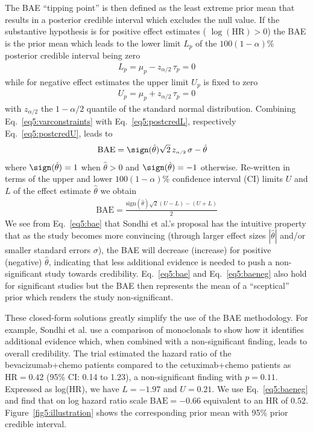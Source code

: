 The BAE ``tipping point'' is then defined as the least extreme prior mean that
results in a posterior credible interval which excludes the null value. If the
substantive hypothesis is for positive effect estimates (\eg
$\log(\mbox{HR}) > 0$) the BAE is the prior mean which leads to the lower limit
$L_{p}$ of the $100(1 - \alpha)$\% posterior credible interval being zero
\begin{align}
  L_{p} = \mu_{p} - z_{\scriptscriptstyle \alpha/2} \, \tau_{p} = 0
  \label{eq5:postcredL}
\end{align}
while for negative effect estimates the upper limit $U_{p}$ is fixed to zero
\begin{align}
  U_{p} = \mu_{p} + z_{\scriptscriptstyle \alpha/2} \, \tau_{p} = 0
  \label{eq5:postcredU}
\end{align}
with $z_{\scriptscriptstyle \alpha/2}$ the $1 - \alpha/2$ quantile of the
standard normal distribution. Combining Eq.~\eqref{eq5:varconstraints} with
Eq.~\eqref{eq5:postcredL}, respectively Eq.~\eqref{eq5:postcredU}, leads to
\begin{align}
  \text{BAE}
  & =  \sign(\hat{\theta}) \sqrt{2} \, z_{\scriptscriptstyle \alpha/2} \, \sigma - \hat{\theta}
    \label{eq5:bae}
\end{align}
where $\sign(\hat{\theta}) = 1$ when $\hat{\theta} > 0$ and
$\sign(\hat{\theta}) = -1$ otherwise. Re-written in terms of the upper and lower
$100(1 - \alpha)$\% confidence interval (CI) limits $U$ and $L$ of the effect
estimate $\hat{\theta}$ we obtain
\begin{align}
  \text{BAE} = \frac{\text{sign}(\hat{\theta}) \sqrt{2} (U - L) - (U + L)}{2}
  \label{eq5:baeneg}
\end{align}
We see from Eq.~\eqref{eq5:bae} that Sondhi et al.'s proposal has the intuitive
property that as the study becomes more convincing (through larger effect sizes
$|\hat{\theta}|$ and/or smaller standard errors $\sigma$), the BAE will decrease
(increase) for positive (negative) $\hat{\theta}$, indicating that less
additional evidence is needed to push a non-significant study towards
credibility. Eq.~\eqref{eq5:bae} and Eq.~\eqref{eq5:baeneg} also hold for
significant studies but the BAE then represents the mean of a ``sceptical''
prior which renders the study non-significant.





These closed-form solutions greatly simplify the use of the BAE methodology. For
example, Sondhi et al. use a comparison of monoclonals to show how it identifies
additional evidence which, when combined with a non-significant finding, leads
to overall credibility. The trial estimated the hazard ratio of the
bevacizumab+chemo patients compared to the cetuximab+chemo patients as
$\mbox{HR} = 0.42$ (95\% CI: 0.14 to 1.23), a non-significant finding with $p = 0.11$. Expressed as log(HR), we
have $L = -1.97$ and
$U = 0.21$. We use Eq.~\eqref{eq5:baeneg} and find that
on log hazard ratio scale $\mbox{BAE} = -0.66$ equivalent to an
HR of $0.52$. Figure~\ref{fig5:illustration} shows the
corresponding prior mean with 95\% prior
credible interval.


